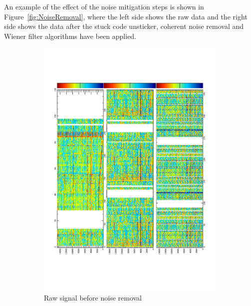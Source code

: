 An example of the effect of the noise mitigation steps is shown in Figure~\ref{fig:NoiseRemoval}, where the left side shows the raw data and the right side shows the data after the stuck code unsticker, coherent noise removal and Wiener filter algorithms have been applied. \\

\begin{figure}[h!]
  \centering
  \begin{subfigure}{0.55\textwidth}
    \centering
    \includegraphics[width=\textwidth]{Evd_BeforeNoise}
    \caption{Raw signal before noise removal}
  \end{subfigure}
  \begin{subfigure}{0.55\textwidth}
    \centering

\end{subfigure}
\end{figure}
